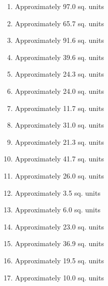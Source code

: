 \begin{enumerate}
	\item Approximately 97.0 sq. units
	\item Approximately 65.7 sq. units
	\item Approximately 91.6 sq. units
	\item Approximately 39.6 sq. units
	\item Approximately 24.3 sq. units
	\item Approximately 24.0 sq. units
	\item Approximately 11.7 sq. units
	\item Approximately 31.0 sq. units
	\item Approximately 21.3 sq. units
	\item Approximately 41.7 sq. units
	\item Approximately 26.0 sq. units
	\item Approximately 3.5 sq. units
	\item Approximately 6.0 sq. units
	\item Approximately 23.0 sq. units
	\item Approximately 36.9 sq. units
	\item Approximately 19.5 sq. units
	\item Approximately 10.0 sq. units
\end{enumerate}